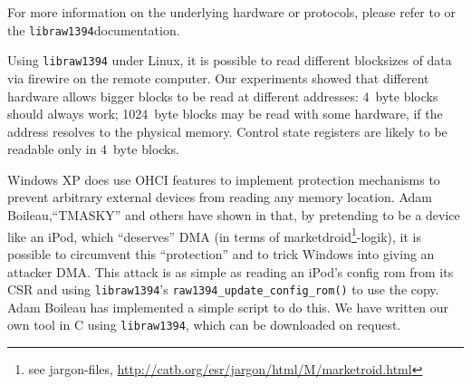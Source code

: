 
For more information on the underlying hardware or protocols, please refer to
\cite{OHCIspecs:2000,fwire_sys_arch:2222} or the
\texttt{libraw1394}\footnotemark[\value{footnote}] documentation.





Using \texttt{libraw1394} under Linux, it is possible to read different
blocksizes of data via firewire on the remote computer. Our experiments showed
that different hardware allows bigger blocks to be read at different addresses:
4~byte blocks should always work; 1024~byte blocks may be read with some
hardware, if the address resolves to the physical memory. Control state
registers are likely to be readable only in 4~byte blocks.


\label{windows-dma} Windows XP does use OHCI features to implement protection
mechanisms to prevent arbitrary external devices from reading any memory
location.  Adam Boileau,``TMASKY'' and others have shown in
\cite{rux2k6firewire:2006} that, by pretending to be a device like an iPod,
which ``deserves'' DMA (in terms of marketdroid\footnote{see jargon-files,
\href{http://catb.org/esr/jargon/html/M/marketroid.html}
{http://catb.org/esr/jargon/html/M/marketroid.html}}-logik), it is possible to
circumvent this ``protection'' and to trick Windows into giving an attacker DMA.
This attack is as simple as reading an iPod's config rom from its CSR and using
\texttt{libraw1394}'s \texttt{raw1394\_update\_config\_rom()} to use the copy.
Adam Boileau has implemented a simple script to do this. We have written our own
tool in C using \texttt{libraw1394}, which can be downloaded on request.


